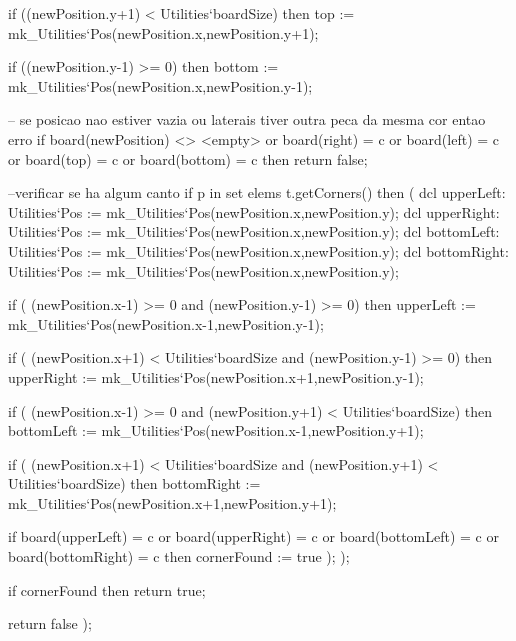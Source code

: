 \begin{vdm_al}
              if ((newPosition.y+1) < Utilities`boardSize) then              
                top := mk_Utilities`Pos(newPosition.x,newPosition.y+1);
                
              if ((newPosition.y-1) >= 0) then
                bottom := mk_Utilities`Pos(newPosition.x,newPosition.y-1);

              -- se posicao nao estiver vazia ou laterais tiver outra peca da mesma cor entao erro
              if board(newPosition) <> <empty> or board(right) = c or board(left) = c or board(top) = c or board(bottom) = c then
                return false;
              
              --verificar se ha algum canto
              if p in set elems t.getCorners() then (
                dcl upperLeft: Utilities`Pos := mk_Utilities`Pos(newPosition.x,newPosition.y);
                dcl upperRight: Utilities`Pos := mk_Utilities`Pos(newPosition.x,newPosition.y);              
                dcl bottomLeft: Utilities`Pos := mk_Utilities`Pos(newPosition.x,newPosition.y);
                dcl bottomRight: Utilities`Pos := mk_Utilities`Pos(newPosition.x,newPosition.y);
                
                if ( (newPosition.x-1) >= 0 and (newPosition.y-1) >= 0) then
                  upperLeft := mk_Utilities`Pos(newPosition.x-1,newPosition.y-1);
                
                if ( (newPosition.x+1)  < Utilities`boardSize and (newPosition.y-1) >= 0) then
                  upperRight := mk_Utilities`Pos(newPosition.x+1,newPosition.y-1);
                  
                if ( (newPosition.x-1) >= 0 and (newPosition.y+1) < Utilities`boardSize) then              
                  bottomLeft := mk_Utilities`Pos(newPosition.x-1,newPosition.y+1);
                  
                if ( (newPosition.x+1)  < Utilities`boardSize and (newPosition.y+1)  < Utilities`boardSize) then
                  bottomRight := mk_Utilities`Pos(newPosition.x+1,newPosition.y+1);
                
                if board(upperLeft) = c or board(upperRight) = c or board(bottomLeft) = c or board(bottomRight) = c then
                  cornerFound := true
              );
            );
            
            if cornerFound then
                return true;
                
            return false
          );
        

\end{vdm_al}
